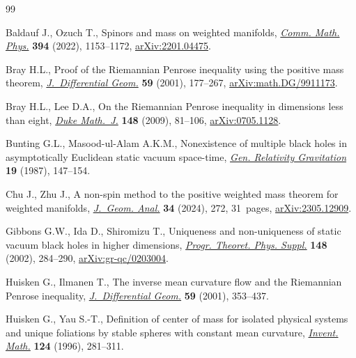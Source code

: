 \documentclass[pdftex]{sigma}
\numberwithin{equation}{section}
\theoremstyle{definition}
\begin{document}
\begin{thebibliography}{99}
\footnotesize\itemsep=0pt

Baldauf J., Ozuch T., Spinors and mass on weighted manifolds,
 \href{https://doi.org/10.1007/s00220-022-04420-y}{\textit{Comm. Math. Phys.}}
 \textbf{394} (2022), 1153--1172,
 \href{http://arxiv.org/abs/2201.04475}{arXiv:2201.04475}.

Bray H.L., Proof of the {R}iemannian {P}enrose inequality using the positive
 mass theorem,
 \href{https://doi.org/10.4310/jdg/1090349428}{\textit{J.~Differential Geom.}}
 \textbf{59} (2001), 177--267,
 \href{http://arxiv.org/abs/math.DG/9911173}{arXiv:math.DG/9911173}.

Bray H.L., Lee D.A., On the {R}iemannian {P}enrose inequality in dimensions
 less than eight,
 \href{https://doi.org/10.1215/00127094-2009-020}{\textit{Duke Math.~J.}}
 \textbf{148} (2009), 81--106,
 \href{http://arxiv.org/abs/0705.1128}{arXiv:0705.1128}.

Bunting G.L., Masood-ul-Alam A.K.M., Nonexistence of multiple black holes in
 asymptotically {E}uclidean static vacuum space-time,
 \href{https://doi.org/10.1007/BF00770326}{\textit{Gen. Relativity
 Gravitation}} \textbf{19} (1987), 147--154.

Chu J., Zhu J., A non-spin method to the positive weighted mass theorem for
 weighted manifolds,
 \href{https://doi.org/10.1007/s12220-024-01725-3}{\textit{J.~Geom. Anal.}}
 \textbf{34} (2024), 272, 31~pages,
 \href{http://arxiv.org/abs/2305.12909}{arXiv:2305.12909}.

Gibbons G.W., Ida D., Shiromizu T., Uniqueness and non-uniqueness of static
 vacuum black holes in higher dimensions, \href{https://doi.org/10.1143/PTPS.148.284}{\textit{Progr. Theoret. Phys. Suppl.}} \textbf{148} (2002), 284--290,
 \href{http://arxiv.org/abs/gr-qc/0203004}{arXiv:gr-qc/0203004}.

Huisken G., Ilmanen T., The inverse mean curvature flow and the {R}iemannian
 {P}enrose inequality,
 \href{https://doi.org/10.4310/jdg/1090349447}{\textit{J.~Differential Geom.}}
 \textbf{59} (2001), 353--437.

Huisken G., Yau S.-T., Definition of center of mass for isolated physical
 systems and unique foliations by stable spheres with constant mean curvature,
 \href{https://doi.org/10.1007/s002220050054}{\textit{Invent. Math.}}
 \textbf{124} (1996), 281--311.


\end{thebibliography}
\end{document}
